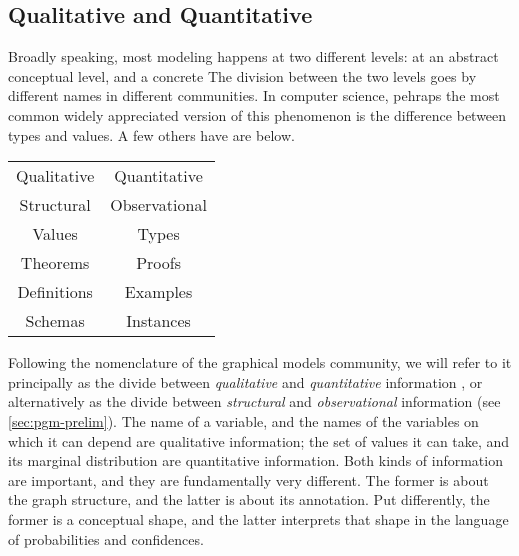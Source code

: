 
\subsection{Qualitative and Quantitative}

Broadly speaking, most modeling happens at two different levels: 
    at an abstract conceptual level, and a concrete 
The division between the two levels goes by different names in different communities. 
In computer science, pehraps the most common
    widely appreciated version of this phenomenon is 
    the difference between types and values.
A few others have are below.

\begin{center}
    \begin{tabular}{c|c}
        Qualitative & Quantitative \\ 
        Structural & Observational \\
        Values & Types \\ 
        Theorems & Proofs \\
        Definitions & Examples \\
        Schemas & Instances 
    \end{tabular}
    \end{center}
    
Following the nomenclature of the graphical models community, we will refer to it principally as the divide between \emph{qualitative} and \emph{quantitative} information 
\unskip, or alternatively as the divide between \emph{structural} and \emph{observational} information (see \cref{sec:pgm-prelim}).
The name of a variable, and the names of the variables on which it can depend are qualitative information; the set of values it can take, and its marginal distribution are quantitative information. 
%
Both kinds of information are important, and they are fundamentally very different. The former is about the graph structure, and the latter is about its annotation. Put differently,
the former is a conceptual shape, and the latter interprets that shape in the language of probabilities and confidences. 

